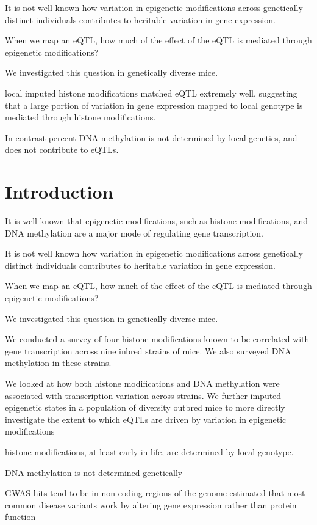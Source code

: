 \documentclass[10pt,letterpaper]{article}
\begin{document}
It is not well known how variation in epigenetic modifications across
genetically distinct individuals contributes to heritable variation in
gene expression.

When we map an eQTL, how much of the effect of the eQTL is mediated
through epigenetic modifications?

We investigated this question in genetically diverse mice.

local imputed histone modifications matched eQTL extremely well,
suggesting that a large portion of variation in gene expression mapped
to local genotype is mediated through histone modifications.

In contrast percent DNA methylation is not determined by local genetics,
and does not contribute to eQTLs.

\hypertarget{introduction}{%
\section{Introduction}\label{introduction}}

It is well known that epigenetic modifications, such as histone
modifications, and DNA methylation are a major mode of regulating gene
transcription.

It is not well known how variation in epigenetic modifications across
genetically distinct individuals contributes to heritable variation in
gene expression.

When we map an eQTL, how much of the effect of the eQTL is mediated
through epigenetic modifications?

We investigated this question in genetically diverse mice.

We conducted a survey of four histone modifications known to be
correlated with gene transcription across nine inbred strains of mice.
We also surveyed DNA methylation in these strains.

We looked at how both histone modifications and DNA methylation were
associated with transcription variation across strains. We further
imputed epigenetic states in a population of diversity outbred mice to
more directly investigate the extent to which eQTLs are driven by
variation in epigenetic modifications

histone modifications, at least early in life, are determined by local
genotype.

DNA methylation is not determined genetically

GWAS hits tend to be in non-coding regions of the genome estimated that
most common disease variants work by altering gene expression rather
than protein function
\end{document}
